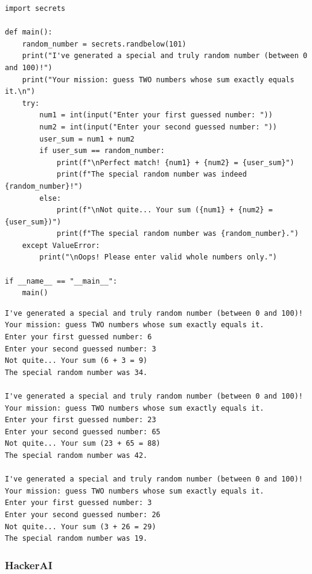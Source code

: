 \documentclass[12pt,a4paper]{article}
\begin{document}
\begin{lstlisting}[style=python, caption={Grok-kode}]
import secrets

def main():
    random_number = secrets.randbelow(101)
    print("I've generated a special and truly random number (between 0 and 100)!")
    print("Your mission: guess TWO numbers whose sum exactly equals it.\n")
    try:
        num1 = int(input("Enter your first guessed number: "))
        num2 = int(input("Enter your second guessed number: "))
        user_sum = num1 + num2
        if user_sum == random_number:
            print(f"\nPerfect match! {num1} + {num2} = {user_sum}")
            print(f"The special random number was indeed {random_number}!")
        else:
            print(f"\nNot quite... Your sum ({num1} + {num2} = {user_sum})")
            print(f"The special random number was {random_number}.")
    except ValueError:
        print("\nOops! Please enter valid whole numbers only.")

if __name__ == "__main__":
    main()
\end{lstlisting}

\begin{lstlisting}[style=terminal, caption={Output fra Grok-koden}]
I've generated a special and truly random number (between 0 and 100)!
Your mission: guess TWO numbers whose sum exactly equals it.
Enter your first guessed number: 6
Enter your second guessed number: 3
Not quite... Your sum (6 + 3 = 9)
The special random number was 34.

I've generated a special and truly random number (between 0 and 100)!
Your mission: guess TWO numbers whose sum exactly equals it.
Enter your first guessed number: 23
Enter your second guessed number: 65
Not quite... Your sum (23 + 65 = 88)
The special random number was 42.

I've generated a special and truly random number (between 0 and 100)!
Your mission: guess TWO numbers whose sum exactly equals it.
Enter your first guessed number: 3
Enter your second guessed number: 26
Not quite... Your sum (3 + 26 = 29)
The special random number was 19.
\end{lstlisting}

\subsubsection*{HackerAI}
\end{document}
